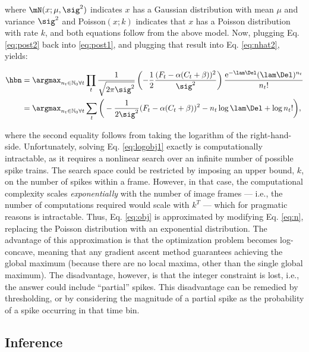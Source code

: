 \noindent where $\mN(x;\mu,\sig^2)$ indicates $x$ has a Gaussian distribution with mean $\mu$ and variance $\sig^2$ and Poisson$(x;k)$ indicates that $x$ has a Poisson distribution with rate $k$, and both equations follow from the above model.  Now, plugging Eq. \eqref{eq:post2} back into \eqref{eq:post1}, and plugging that result into Eq. \eqref{eq:nhat2}, yields:

\begin{subequations}  \label{eq:obj}
\begin{align}
\hbn 	&= \anx \prod_t \frac{1}{\sqrt{2 \pi \sig^2}} \left(-\frac{1}{2}\frac{(F_t - \alpha (C_t + \beta))^2}{\sig^2}\right) \frac{\text{e}^{-\lam\Del} (\lam\Del)^{n_t}}{n_t!}
\label{eq:obj1}\\ &= \anx  \sum_t \bigg( -\frac{1}{2 \sig^2}(F_t - \alpha(C_t + \beta))^2  -  n_t \log \lam \Del + \log n_t! \bigg), \label{eq:logobj1}
\end{align} 
\end{subequations}

\noindent where the second equality follows from taking the logarithm of the right-hand-side.  Unfortunately, solving Eq. \eqref{eq:logobj1} exactly is computationally intractable, as it requires a nonlinear search over an infinite number of  possible spike trains.  The search space could be restricted by imposing an upper bound, $k$, on the number of spikes within a frame.  However, in that case, the computational complexity scales \emph{exponentially} with the number of image frames --- i.e., the number of computations required would scale with $k^T$ --- which for pragmatic reasons is intractable.  Thus, Eq. \eqref{eq:obj} is approximated by modifying Eq. \eqref{eq:n}, replacing the Poisson distribution with an exponential distribution.  The advantage of this approximation is that the optimization problem becomes log-concave, meaning that any gradient ascent method guarantees achieving the global maximum (because there are no local maxima, other than the single global maximum).  The disadvantage, however, is that the integer constraint is lost, i.e., the answer could include ``partial'' spikes.  This disadvantage can be remedied by thresholding, or by considering the magnitude of a partial spike as the probability of a spike occurring in that time bin.  




\subsection{Inference} \label{sec:inf}

